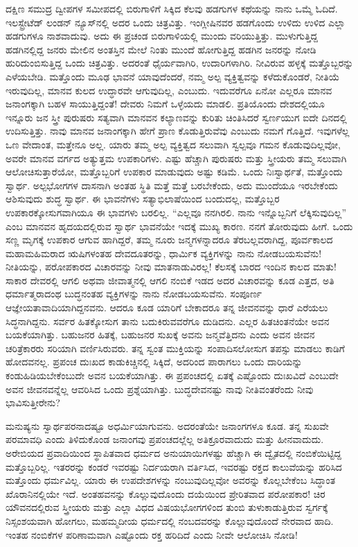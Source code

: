 ದಕ್ಷಿಣ ಸಮುದ್ರ ದ್ವೀಪಗಳ ಸಮೀಪದಲ್ಲಿ ಬಿರುಗಾಳಿಗೆ ಸಿಕ್ಕಿದ ಕೆಲವು ಹಡಗುಗಳ ಕಥೆಯನ್ನು ನಾನು ಒಮ್ಮೆ ಓದಿದೆ. ಇಲಸ್ಟ್ರೇಟೆಡ್​ ಲಂಡನ್​ ನ್ಯೂಸ್​ನಲ್ಲಿ ಅದರ ಒಂದು ಚಿತ್ರವಿತ್ತು. ಇಂಗ್ಲೀಷಿನವರ ಹಡಗೊಂದು ಉಳಿದು ಉಳಿದ ಎಲ್ಲಾ ಹಡಗುಗಳೂ ನಾಶವಾದುವು. ಅದು ಈ ಪ್ರಚಂಡ ಬಿರುಗಾಳಿಯಲ್ಲಿ ಮುಂದು ವರಿಯುತ್ತಿತ್ತು. ಮುಳುಗುತ್ತಿದ್ದ ಹಡಗಿನಲ್ಲಿದ್ದ ಜನರು ಮೇಲಿನ ಅಂತಸ್ತಿನ ಮೇಲೆ ನಿಂತು ಮುಂದೆ ಹೋಗುತ್ತಿದ್ದ ಹಡಗಿನ ಜನರನ್ನು ನೋಡಿ ಹುರಿದುಂಬಿಸುತ್ತಿದ್ದ ಒಂದು ಚಿತ್ರವಿತ್ತು. ಅದರಂತೆ ಧೈರ್ಯವಾಗಿರಿ, ಉದಾರಿಗಳಾಗಿರಿ. ನೀವಿರುವ ಹಳ್ಳಕ್ಕೆ ಮತ್ತೊಬ್ಬರನ್ನು ಎಳೆಯಬೇಡಿ. ಮತ್ತೊಂದು ಮೂಢ ಭಾವನೆ ಯಾವುದೆಂದರೆ, ನಮ್ಮ ಅಲ್ಪ ವ್ಯಕ್ತಿತ್ವವನ್ನು ಕಳೆದುಕೊಂಡರೆ, ನೀತಿಯೆ ಇರುವುದಿಲ್ಲ, ಮಾನವ ಕುಲದ ಉದ್ಧಾರವೇ ಆಗುವುದಿಲ್ಲ, ಎಂಬುದು. ಇದುವರೆಗೂ ಏನೋ ಎಲ್ಲರೂ ಮಾನವ ಜನಾಂಗಕ್ಕಾಗಿ ಬಹಳ ಸಾಯುತ್ತಿದ್ದಂತೆ! ದೇವರು ನಿಮಗೆ ಒಳ್ಳೆಯದು ಮಾಡಲಿ. ಪ್ರತಿಯೊಂದು ದೇಶದಲ್ಲಿಯೂ ಇನ್ನೂರು ಜನ ಸ್ತ್ರೀ ಪುರುಷರು ಸತ್ಯವಾಗಿ ಮಾನವನ ಕಲ್ಯಾಣವನ್ನು ಕುರಿತು ಚಿಂತಿಸಿದರೆ ಸ್ವರ್ಣಯುಗ ಐದೇ ದಿನದಲ್ಲಿ ಉದಿಸುತ್ತಿತ್ತು. ನಾವು ಮಾನವ ಜನಾಂಗಕ್ಕಾಗಿ ಹೇಗೆ ಪ್ರಾಣ ಕೊಡುತ್ತಿರುವೆವು ಎಂಬುದು ನಮಗೆ ಗೊತ್ತಿದೆ. ಇವುಗಳೆಲ್ಲ ಒಣ ವೇದಾಂತ, ಮತ್ತೇನೂ ಅಲ್ಲ. ಯಾರು ತಮ್ಮ ಅಲ್ಪ ವ್ಯಕ್ತಿತ್ವದ ಸಲುವಾಗಿ ಸ್ವಲ್ಪವೂ ಗಮನ ಕೊಡುವುದಿಲ್ಲವೋ, ಅವರೇ ಮಾನವ ವರ್ಗದ ಅತ್ಯುತ್ತಮ ಉಪಕಾರಿಗಳು. ಎಷ್ಟು ಹೆಚ್ಚಾಗಿ ಪುರುಷರು ಮತ್ತು ಸ್ತ್ರೀಯರು ತಮ್ಮ ಸಲುವಾಗಿ ಆಲೋಚಿಸುತ್ತಾರೆಯೋ, ಮತ್ತೊಬ್ಬರಿಗೆ ಉಪಕಾರ ಮಾಡುವುದು ಅಷ್ಟು ಕಡಿಮೆ. ಒಂದು ನಿಃಸ್ವಾರ್ಥತೆ, ಮತ್ತೊಂದು ಸ್ವಾರ್ಥ. ಅಲ್ಪಭೋಗಗಳ ದಾಸನಾಗಿ ಅಂತಹ ಸ್ಥಿತಿ ಮತ್ತೆ ಮತ್ತೆ ಬರಬೇಕೆಂದು, ಅದು ಮುಂದೆಯೂ ಇರಬೇಕೆಂದು ಆಶಿಸುವುದು ಶುದ್ಧ ಸ್ವಾರ್ಥ. ಈ ಭಾವನೆಗಳು ಸತ್ಯಾಭಿಲಾಷೆಯಿಂದ ಬಂದುದಲ್ಲ, ಮತ್ತೊಬ್ಬರ ಉಪಕಾರಕ್ಕೋಸುಗವಾಗಿಯೂ ಈ ಭಾವಗಳು ಬರಲಿಲ್ಲ. “ಎಲ್ಲವೂ ನನಗಿರಲಿ. ನಾನು ಇನ್ನೊಬ್ಬನಿಗೆ ಲೆಕ್ಕಿಸುವುದಿಲ್ಲ” ಎಂಬ ಮಾನವನ ಹೃದಯದಲ್ಲಿರುವ ಸ್ವಾರ್ಥ ಭಾವನೆಯೇ ಇದಕ್ಕೆ ಮುಖ್ಯ ಕಾರಣ. ನನಗೆ ತೋರುವುದು ಹೀಗೆ. ಒಂದು ಸಣ್ಣ ಮೃಗಕ್ಕೆ ಉಪಕಾರ ಆಗುವ ಹಾಗಿದ್ದರೆ, ತಮ್ಮ ನೂರು ಜನ್ಮಗಳನ್ನಾದರೂ ತೆರಬಲ್ಲವರಾಗಿದ್ದ, ಪೂರ್ವಕಾಲದ ಮಹಾಮಹಿಮರಾದ ಋಷಿಗಳಂತಹ ದೇವದೂತರನ್ನು, ಧಾರ್ಮಿಕ ವ್ಯಕ್ತಿಗಳನ್ನು ನಾನು ನೋಡಬಯಸುವೆನು! ನೀತಿಯನ್ನು, ಪರೋಪಕಾರದ ವಿಚಾರವನ್ನು ನೀವು ಮಾತನಾಡುವಿರಲ್ಲ! ಕೆಲಸಕ್ಕೆ ಬಾರದ ಇಂದಿನ ಕಾಲದ ಮಾತು! ಸಾಕಾರ ದೇವರಲ್ಲಿ ಆಗಲಿ ಅಥವಾ ಜೀವಾತ್ಮನಲ್ಲಿ ಆಗಲಿ ನಂಬಿಕೆ ಇಡದ ಅದರ ವಿಚಾರವನ್ನು ಕೂಡ ಎತ್ತದ, ಅತಿ ಧರ್ಮಾತ್ಮರಾದಂಥ ಬುದ್ಧನಂತಹ ವ್ಯಕ್ತಿಗಳನ್ನು ನಾನು ನೋಡಬಯಸುವೆನು. ಸಂಪೂರ್ಣ ಆಜ್ಞೇಯತಾವಾದಿಯಾಗಿದ್ದನವನು. ಆದರೂ ಕೂಡ ಯಾರಿಗೆ ಬೇಕಾದರೂ ತನ್ನ ಜೀವನವನ್ನು ಧಾರೆ ಎರೆಯಲು ಸಿದ್ಧನಾಗಿದ್ದನು. ಸರ್ವರ ಹಿತಕ್ಕೋಸುಗ ತಾನು ಬದುಕಿರುವವರೆಗೂ ದುಡಿದನು. ಎಲ್ಲರ ಹಿತಚಿಂತನೆಯೇ ಅವನ ಬಯಕೆಯಾಗಿತ್ತು. ಬಹುಜನರ ಹಿತಕ್ಕೆ, ಬಹುಜನರ ಸುಖಕ್ಕೆ ಅವನು ಜನ್ಮವೆತ್ತಿದನು ಎಂದು ಅವನ ಜೀವನ ಚರಿತ್ರೆಕಾರರು ಸರಿಯಾಗಿ ವರ್ಣಿಸಿರುವರು. ತನ್ನ ಸ್ವಂತ ಮುಕ್ತಿಯನ್ನು ಸಂಪಾದಿಸಲೋಸುಗ ತಪಸ್ಸು ಮಾಡಲು ಕಾಡಿಗೆ ಹೋದವನಲ್ಲ. ಪ್ರಪಂಚ ದುಃಖದ ಕಾಡುಕಿಚ್ಚಿನಲ್ಲಿ ಸಿಕ್ಕಿದೆ, ಅದರಿಂದ ಪಾರಾಗಲು ಒಂದು ದಾರಿಯನ್ನು ಕಂಡುಹಿಡಿಯಬೇಕೆಂಬುದೇ ಅವನ ಬಯಕೆಯಾಗಿತ್ತು. ಈ ಪ್ರಪಂಚದಲ್ಲಿ ಏತಕ್ಕೆ ಎಷ್ಟೊಂದು ದುಃಖವಿದೆ ಎಂಬುದೇ ಅವನ ಜೀವನವನ್ನೆಲ್ಲ ಆವರಿಸಿದ ಒಂದು ಪ್ರಶ್ನೆಯಾಗಿತ್ತು. ಬುದ್ಧದೇವನಷ್ಟು ನಾವು ನೀತಿವಂತರೆಂದು ನೀವು ಭಾವಿಸುತ್ತೀರೇನು?

\vskip 5pt

ಮನುಷ್ಯನು ಸ್ವಾರ್ಥಪರನಾದಷ್ಟೂ ಅಧರ್ಮಿಯಾಗುವನು. ಅದರಂತೆಯೇ ಜನಾಂಗಗಳೂ ಕೂಡ. ತನ್ನ ಸುಖವೇ ಪರಮಾವಧಿ ಎಂದು ತಿಳಿದುಕೊಂಡ ಜನಾಂಗವು ಪ್ರಪಂಚದಲ್ಲೆಲ್ಲ ಅತಿಕ್ರೂರವಾದುದು ಮತ್ತು ಹೀನವಾದುದು. ಅರೇಬಿಯದ ಪ್ರವಾದಿಯಿಂದ ಸ್ಥಾಪಿತವಾದ ಧರ್ಮದ ಅನುಯಾಯಿಗಳಷ್ಟು ಹೆಚ್ಚಾಗಿ ಈ ದ್ವೈತದಲ್ಲಿ ನಂಬಿಕೆಯಿಟ್ಟಿದ್ದ ಮತ್ತೊಬ್ಬರಿಲ್ಲ. ಇತರರನ್ನು ಕಂಡರೆ ಇವರಷ್ಟು ನಿರ್ದಯರಾಗಿ ವರ್ತಿಸಿದ, ಇವರಷ್ಟು ರಕ್ತದ ಕಾಲುವೆಯನ್ನು ಹರಿಸಿದ ಮತ್ತೊಂದು ಧರ್ಮವಿಲ್ಲ. ಯಾರು ಈ ಉಪದೇಶಗಳನ್ನು ನಂಬುವುದಿಲ್ಲವೋ ಅವರನ್ನು ಕೊಲ್ಲಬೇಕೆಂಬ ಸಿದ್ಧಾಂತ ಖೊರಾನಿನಲ್ಲಿಯೇ ಇದೆ. ಅಂತಹವನನ್ನು ಕೊಲ್ಲುವುದೊಂದು ದಯೆಯಿಂದ ಪ್ರೇರಿತವಾದ ಪರೋಪಕಾರ! ಚಿರ ಯೌವನದಲ್ಲಿರುವ ಸ್ತ್ರೀಯರು ಮತ್ತು ಎಲ್ಲಾ ವಿಧದ ವಿಷಯಭೋಗಗಳಿಂದ ತುಂಬಿ ತುಳುಕಾಡುತ್ತಿರುವ ಸ್ವರ್ಗಕ್ಕೆ ನಿಸ್ಸಂಶಯವಾಗಿ ಹೋಗಲು, ಮಹಮ್ಮದೀಯ ಧರ್ಮದಲ್ಲಿ ನಂಬದವರನ್ನು ಕೊಲ್ಲುವುದೊಂದೆ ನೇರವಾದ ಹಾದಿ. ಇಂತಹ ನಂಬಿಕೆಗಳ ಪರಿಣಾಮವಾಗಿ ಎಷ್ಟೊಂದು ರಕ್ತ ಹರಿದಿದೆ ಎಂದು ನೀವೇ ಆಲೋಚಿಸಿ ನೋಡಿ!

